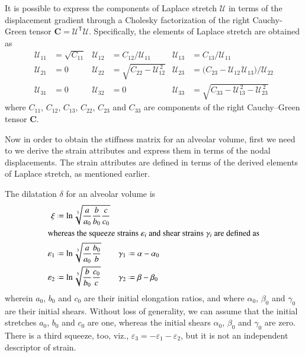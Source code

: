 It is possible to express the components of Laplace stretch $\boldsymbol{\mathcal{U}}$ in terms of the displacement gradient through a Cholesky factorization of the right Cauchy-Green tensor $\mathbf{C} = \boldsymbol{\mathcal{U}}^{\mathsf{T}} \boldsymbol{\mathcal{U}}$. Specifically, the elements of Laplace stretch are obtained as \cite{Srinivasa12}
\begin{equation}
\begin{aligned}
\mathcal{U}_{11} & = \sqrt{C_{11}} & 
\mathcal{U}_{12} & = C_{12} / \mathcal{U}_{11} &
\mathcal{U}_{13} & = C_{13} / \mathcal{U}_{11} \\
\mathcal{U}_{21} & = 0 &
\mathcal{U}_{22} & = \sqrt{C_{22} - \mathcal{U}_{12}^{\,2}} &
\mathcal{U}_{23} & = \bigl( C_{23} - \mathcal{U}_{12\,}\mathcal{U}_{13} \bigr) / \mathcal{U}_{22} \\
\mathcal{U}_{31} & = 0 &
\mathcal{U}_{32} & = 0 & 
\mathcal{U}_{33} & = \sqrt{C_{33} - \mathcal{U}_{13}^{\,2} - \mathcal{U}_{23}^{\,2}}
\end{aligned}
\label{LagrangianLaplaceStretch}
\end{equation}
where ${C_{11}}$, ${C_{12}}$, ${C_{13}}$, $C_{22}$, $C_{23}$ and ${C_{33}}$ are components of the right Cauchy--Green tensor $\mathbf{C}$.

Now in order to obtain the stiffness matrix for an alveolar volume, first we need to we derive the strain attributes and express them in terms of the nodal displacements. The strain attributes are defined in terms of the derived elements of Laplace stretch, as mentioned earlier.

The dilatation $\delta$ for an alveolar volume is
\begin{subequations}
    \begin{align}
    \mathrm  \xi & \defeq \ln \sqrt[3]{\frac{a}{a_0}
        \frac{b}{b_0} \frac{c}{c_0}} \\
    \intertext{whereas the squeeze strains $\varepsilon_i$ and shear strains $\gamma_i$ are defined as}
    \varepsilon_1 & \defeq \ln \sqrt[3]{\frac{a}
        {a_0} \frac{b_0}{b}} & 	\gamma_1 & \defeq \alpha - \alpha_0 \\
    \varepsilon_2 & \defeq \ln \sqrt[3]{\frac{b}
        {b_0} \frac{c_0}{c}} & \gamma_2 & \defeq \beta - \beta_0 
    \end{align}
\end{subequations}
wherein $a_0$, $b_0$ and $c_0$ are their initial elongation ratios, and where $\alpha_0$, $\beta_0$ and $\gamma_0$ are their initial shears. Without loss of generality, we can assume that the initial stretches $a_0$, $b_0$ and $c_0$ are one, whereas the initial shears $\alpha_0$, $\beta_0$ and $\gamma_0$ are zero. There is a third squeeze, too, viz., $\varepsilon_3 = -\varepsilon_1 - \varepsilon_2$, but it is not an independent descriptor of strain.


